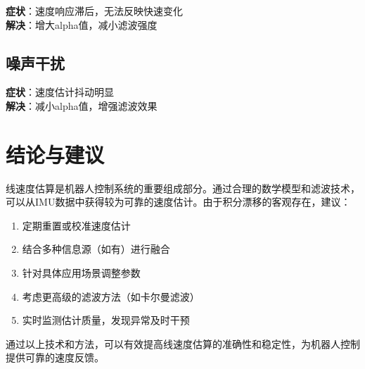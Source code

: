 \documentclass[12pt,a4paper]{article}
\begin{document}
\textbf{症状}：速度响应滞后，无法反映快速变化\\
\textbf{解决}：增大alpha值，减小滤波强度

\subsection{噪声干扰}

\textbf{症状}：速度估计抖动明显\\
\textbf{解决}：减小alpha值，增强滤波效果

\section{结论与建议}

线速度估算是机器人控制系统的重要组成部分。通过合理的数学模型和滤波技术，可以从IMU数据中获得较为可靠的速度估计。由于积分漂移的客观存在，建议：

\begin{enumerate}
    \item 定期重置或校准速度估计
    \item 结合多种信息源（如有）进行融合
    \item 针对具体应用场景调整参数
    \item 考虑更高级的滤波方法（如卡尔曼滤波）
    \item 实时监测估计质量，发现异常及时干预
\end{enumerate}

通过以上技术和方法，可以有效提高线速度估算的准确性和稳定性，为机器人控制提供可靠的速度反馈。
\end{document}
